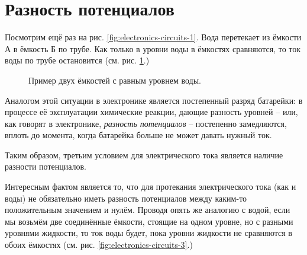 \documentclass[../sparc.tex]{subfiles}
\begin{document}
\section{Разность потенциалов}

Посмотрим ещё раз на рис. \ref{fig:electronics-circuits-1}.  Вода перетекает из
ёмкости А в ёмкость Б по трубе.  Как только в уровни воды в ёмкостях сравняются,
то ток воды по трубе остановится (см. рис. \ref{fig:electronics-circuits-2}.)

\begin{figure}[ht]
  \centering
  \caption{Пример двух ёмкостей с равным уровнем воды.}
  \label{fig:electronics-circuits-2}
\end{figure}

Аналогом этой ситуации в электронике является постепенный разряд батарейки: в
процессе её эксплуатации химические реакции, дающие разность уровней -- или, как
говорят в электронике, \emph{разность потенциалов} -- постепенно замедляются,
вплоть до момента, когда батарейка больше не может давать нужный ток.

Таким образом, третьим условием для электрического тока является наличие
разности потенциалов.

Интересным фактом является то, что для протекания электрического тока (как и
воды) не обязательно иметь разность потенциалов между каким-то положительным
значением и нулём. Проводя опять же аналогию с водой, если мы возьмём две
соединённые ёмкости, стоящие на одном уровне, но с разными уровнями жидкости, то
ток воды будет, пока уровни жидкости не сравняются в обоих ёмкостях (см. рис.
\ref{fig:electronics-circuits-3}.)
\end{document}
